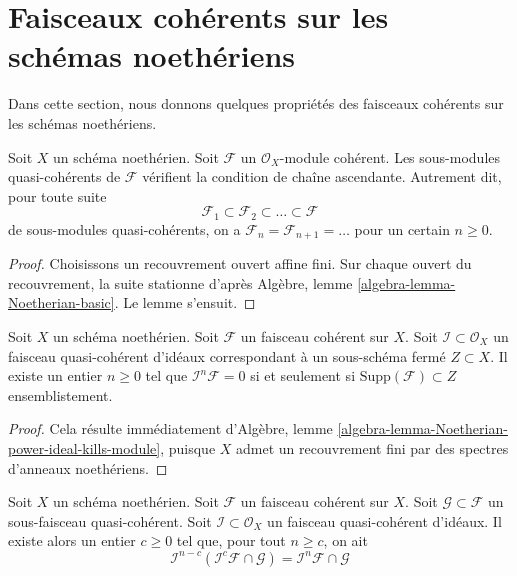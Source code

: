 \section{Faisceaux cohérents sur les schémas noethériens}
\label{section-coherent-quasi-compact}

\noindent
Dans cette section, nous donnons quelques propriétés des faisceaux cohérents sur les
schémas noethériens.

\begin{lemma}
\label{lemma-acc-coherent}
Soit $X$ un schéma noethérien.
Soit $\mathcal{F}$ un $\mathcal{O}_X$-module
cohérent. Les sous-modules quasi-cohérents
de $\mathcal{F}$ vérifient la condition de chaîne ascendante. Autrement dit, pour toute suite
$$
\mathcal{F}_1 \subset \mathcal{F}_2 \subset \ldots \subset \mathcal{F}
$$
de sous-modules quasi-cohérents, on a
$\mathcal{F}_n = \mathcal{F}_{n + 1} = \ldots $ pour un certain $n \geq 0$.
\end{lemma}

\begin{proof}
Choisissons un recouvrement ouvert affine fini.
Sur chaque ouvert du recouvrement, la suite stationne d'après
Algèbre, lemme \ref{algebra-lemma-Noetherian-basic}.
Le lemme s'ensuit.
\end{proof}

\begin{lemma}
\label{lemma-power-ideal-kills-sheaf}
Soit $X$ un schéma noethérien.
Soit $\mathcal{F}$ un faisceau cohérent sur $X$.
Soit $\mathcal{I} \subset \mathcal{O}_X$ un faisceau
quasi-cohérent d'idéaux correspondant à un sous-schéma fermé $Z \subset X$.
Il existe un entier $n \geq 0$ tel que $\mathcal{I}^n\mathcal{F} = 0$
si et seulement si $\text{Supp}(\mathcal{F}) \subset Z$ ensemblistement.
\end{lemma}

\begin{proof}
Cela résulte immédiatement
d'Algèbre, lemme \ref{algebra-lemma-Noetherian-power-ideal-kills-module},
puisque $X$ admet un recouvrement fini par des spectres d'anneaux noethériens.
\end{proof}

\begin{lemma}
\label{lemma-Artin-Rees}
Soit $X$ un schéma noethérien.
Soit $\mathcal{F}$ un faisceau cohérent sur $X$.
Soit $\mathcal{G} \subset \mathcal{F}$ un sous-faisceau quasi-cohérent.
Soit $\mathcal{I} \subset \mathcal{O}_X$ un faisceau quasi-cohérent d'idéaux.
Il
existe alors un entier $c \geq 0$ tel que, pour tout $n \geq c$, on
ait
$$
\mathcal{I}^{n - c}(\mathcal{I}^c\mathcal{F} \cap \mathcal{G})
=
\mathcal{I}^n\mathcal{F} \cap \mathcal{G}
$$
\end{lemma}

